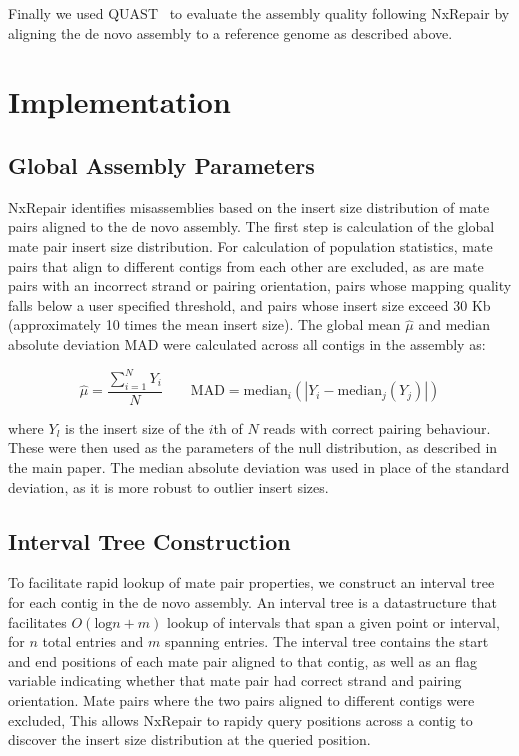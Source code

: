 \documentclass[12pt]{article}
\begin{document}
Finally we used QUAST~\cite{gurevich2013} to evaluate the assembly quality following NxRepair by aligning the de novo assembly to a reference genome as described above.

\section{Implementation}
\subsection{Global Assembly Parameters}
NxRepair identifies misassemblies based on the insert size distribution of mate pairs aligned to the de novo assembly. The first step is calculation of the global mate pair insert size distribution. For calculation of population statistics, mate pairs that align to different contigs from each other are excluded, as are mate pairs with an incorrect strand or pairing orientation, pairs whose mapping quality falls below a user specified threshold, and pairs whose insert size exceed 30 Kb (approximately 10 times the mean insert size). The global mean $\hat{\mu}$ and median absolute deviation $\text{MAD}$ were calculated across all contigs in the assembly as:

\begin{equation}
\hat{\mu} = \frac{\sum_{i=1}^N Y_i}{N} \qquad \text{MAD} = \text{median}_i(|Y_i - \text{median}_j(Y_j)|)
\label{eq:global}
\end{equation}

where $Y_l$ is the insert size of the $i$th of $N$ reads with correct pairing behaviour. These were then used as the parameters of the null distribution, as described in the main paper. The median absolute deviation was used in place of the standard deviation, as it is more robust to outlier insert sizes.

\subsection{Interval Tree Construction}
To facilitate rapid lookup of mate pair properties, we construct an interval tree~\cite{cormen2009} for each contig in the de novo assembly. An interval tree is a datastructure that facilitates $O(\text{log} n + m)$ lookup of intervals that span a given point or interval, for $n$ total entries and $m$ spanning entries. The interval tree contains the start and end positions of each mate pair aligned to that contig, as well as an flag variable indicating whether that mate pair had correct strand and pairing orientation. Mate pairs where the two pairs aligned to different contigs were excluded,  This allows NxRepair to rapidy query positions across a contig to discover the insert size distribution at the queried position.  
\end{document}
